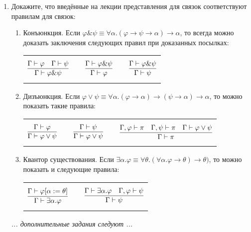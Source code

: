 \documentclass[10pt,a4paper,oneside]{article}
\begin{document}
\begin{enumerate}
\item Докажите, что введённые на лекции представления для связок соответствуют правилам для связок:

\begin{enumerate} 
\item Конъюнкция. 
Если $\varphi \& \psi \equiv \forall \alpha.(\varphi\rightarrow\psi\rightarrow\alpha)\rightarrow\alpha$,
то всегда можно доказать заключения следующих правил при доказанных посылках:

\begin{center}\begin{tabular}{lp{0.5cm}lp{0.5cm}l}
$$\infer{\Gamma\vdash\varphi\&\psi}{\Gamma\vdash\varphi\quad\Gamma\vdash\psi}$$ &&
$$\infer{\Gamma\vdash\varphi}{\Gamma\vdash\varphi\&\psi}$$ &&
$$\infer{\Gamma\vdash\psi}{\Gamma\vdash\varphi\&\psi}$$
\end{tabular}\end{center}

\item Дизъюнкция.
Если $\varphi \vee \psi \equiv \forall \alpha.(\varphi\rightarrow\alpha)\rightarrow(\psi\rightarrow\alpha)\rightarrow\alpha$,
то можно показать такие правила:
\begin{center}\begin{tabular}{lp{0.5cm}lp{0.5cm}l}
$$\infer{\Gamma\vdash\varphi\vee\psi}{\Gamma\vdash\varphi}$$ &&
$$\infer{\Gamma\vdash\varphi\vee\psi}{\Gamma\vdash\psi}$$ &&
$$\infer{\Gamma\vdash\pi}{\Gamma,\varphi\vdash\pi\quad\Gamma,\psi\vdash\pi\quad\Gamma\vdash\varphi\vee\psi}$$
\end{tabular}\end{center}

\item Квантор существования.
Если $\exists \alpha.\varphi \equiv \forall \theta.(\forall\alpha.\varphi\rightarrow\theta)\rightarrow\theta)$, то
можно показать и следующие правила:

\begin{center}\begin{tabular}{lp{1cm}l}
$$\infer{\Gamma\vdash\exists \alpha.\varphi}{\Gamma\vdash\varphi[\alpha := \theta]}$$ &&
$$\infer{\Gamma\vdash\psi}{\Gamma\vdash\exists\alpha.\varphi\quad\Gamma,\varphi\vdash\psi}$$
\end{tabular}\end{center}

\end{enumerate}

\emph{... дополнительные задания следуют ...}

\end{enumerate}
\end{document}
